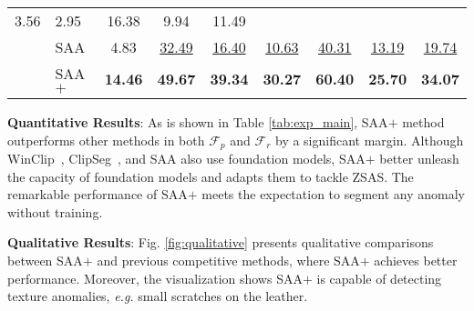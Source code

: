 \begin{table}[t]
{\begin{tabular}{c|l|cccc|cc|c}
  \multicolumn{1}{c|}{3.56} &
  2.95 &
  \multicolumn{1}{c|}{16.38} &
  9.94 &
  11.49 \\ \cmidrule(l){2-9} 
 &
  SAA &
  \multicolumn{1}{c|}{4.83} &
  \multicolumn{1}{c|}{{\ul {32.49}}} &
  \multicolumn{1}{c|}{{\ul {16.40}}} &
  {\ul {10.63}} &
  \multicolumn{1}{c|}{{\ul {40.31}}} &
  {\ul {13.19}} &
  {\ul {19.74}} \\%
 &
  SAA$+$ &
  \multicolumn{1}{c|}{\textbf{14.46}} &
  \multicolumn{1}{c|}{\textbf{49.67}} &
  \multicolumn{1}{c|}{\textbf{39.34}} &
  \textbf{30.27} &
  \multicolumn{1}{c|}{\textbf{60.40}} &
  \textbf{25.70} &
  \textbf{34.07} \\ \bottomrule
\end{tabular}}
\end{table}
\noindent\textbf{Quantitative Results}: As is shown in Table \ref{tab:exp_main}, SAA$+$ method outperforms other methods in both $\mathcal{F}_{p}$ and $\mathcal{F}_{r}$ by a significant margin. Although WinClip~\cite{jeong2023winclip}, ClipSeg~\cite{clipseg2022}, and SAA also use foundation models, SAA$+$ better unleash the capacity of foundation models and adapts them to tackle ZSAS. The remarkable performance of SAA$+$ meets the expectation to segment any anomaly without training.

\noindent\textbf{Qualitative Results}: Fig. \ref{fig:qualitative} presents qualitative comparisons between  SAA$+$ and previous competitive methods, where SAA$+$ achieves better performance. Moreover, the visualization shows SAA$+$ is capable of detecting texture anomalies, \textit{e.g.} small scratches on the leather. 

